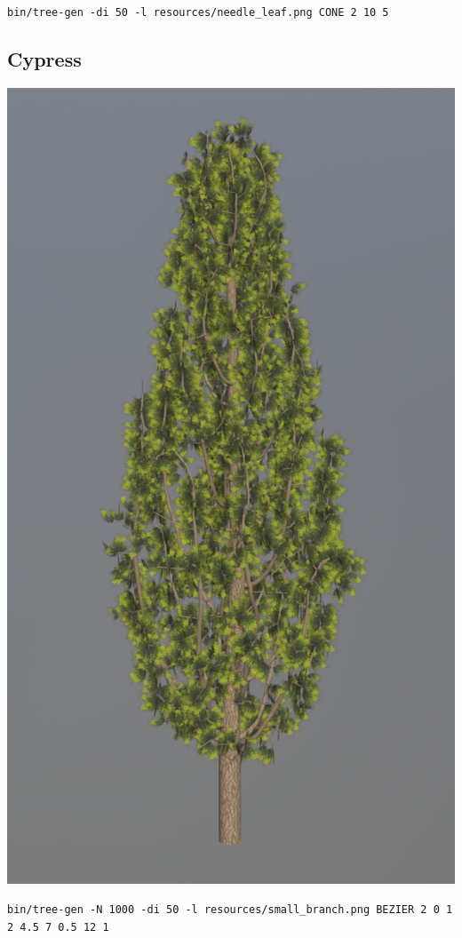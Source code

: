 \documentclass[10pt,a4paper]{article}
\begin{document}
\texttt{bin/tree-gen -di 50 -l resources/needle\_leaf.png CONE 2 10 5}

\subsection{Cypress}

\begin{center}
\includegraphics[scale=.28]{cypress.png}
\end{center}

\texttt{bin/tree-gen -N 1000 -di 50 -l resources/small\_branch.png BEZIER 2 0 1 2 4.5 7 0.5 12 1}
\end{document}
